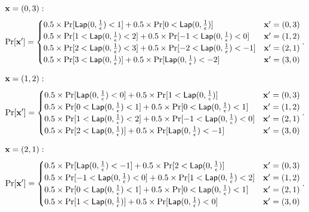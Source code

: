 \documentclass{article}
\begin{document}
{\small

\noindent $\textbf{x} = (0,3):$
\[
\Pr[\dataobs']
= \begin{cases}
	0.5 \times 
 	\Pr[	\lap{0}{\frac{1}{\epsilon}}	<	1] 
 	+ 	
 	0.5 \times 
 	\Pr[	0	< \lap{0}{\frac{1}{\epsilon}}] 
%
	& \dataobs' = (0, 3)\\
%
 	0.5 \times 
 	\Pr[	1	< \lap{0}{\frac{1}{\epsilon}}	<	2] 
 	+ 	
 	0.5 \times 
 	\Pr[	-1	< \lap{0}{\frac{1}{\epsilon}}	<	0] 
%
	& \dataobs' = (1, 2)\\
%
 	0.5 \times 
 	\Pr[	2	<	\lap{0}{\frac{1}{\epsilon}}	<	3] 
 	+ 	
 	0.5 \times 
 	\Pr[	-2	< \lap{0}{\frac{1}{\epsilon}}	<	-1] 
%
	& \dataobs' = (2, 1)\\
%
 	0.5 \times 
 	\Pr[	3	<	\lap{0}{\frac{1}{\epsilon}}]
 	+ 	
 	0.5 \times 
 	\Pr[	\lap{0}{\frac{1}{\epsilon}}	<	-2] 
%
& \dataobs' = (3, 0)
\end{cases}.
\]


\noindent $\textbf{x} = (1,2):$
\[
\Pr[\dataobs']
= \begin{cases}
 	0.5 \times 
 	\Pr[	\lap{0}{\frac{1}{\epsilon}}	<	0] 
 	+ 	
 	0.5 \times 
 	\Pr[	1	< \lap{0}{\frac{1}{\epsilon}}] 
	& \dataobs' = (0, 3)\\
%
 	0.5 \times 
 	\Pr[	0	< \lap{0}{\frac{1}{\epsilon}}	<	1] 
 	+ 	
 	0.5 \times 
 	\Pr[	0	< \lap{0}{\frac{1}{\epsilon}}	<	1] 
	& \dataobs' = (1, 2)\\
%
 	0.5 \times 
 	\Pr[	1	<	\lap{0}{\frac{1}{\epsilon}}	<	2] 
 	+ 	
 	0.5 \times 
 	\Pr[	-1	< \lap{0}{\frac{1}{\epsilon}}	<	0] 
	& \dataobs' = (2, 1)\\
%
 	0.5 \times 
 	\Pr[	2	<	\lap{0}{\frac{1}{\epsilon}}] 
 	+ 	
 	0.5 \times 
 	\Pr[	\lap{0}{\frac{1}{\epsilon}}	<	-1] 
	& \dataobs' = (3, 0)
\end{cases}.
\]

\noindent $\textbf{x} = (2,1):$
\[
\Pr[\dataobs']
= \begin{cases}
 	0.5 \times 
 	\Pr[	\lap{0}{\frac{1}{\epsilon}}	<	-1]
 	+ 	
 	0.5 \times 
 	\Pr[	2	< \lap{0}{\frac{1}{\epsilon}}] 
%
	& \dataobs' = (0, 3)\\
%
 	0.5 \times 
 	\Pr[	-1	< \lap{0}{\frac{1}{\epsilon}}	<	0] 
 	+ 	
 	0.5 \times 
 	\Pr[	1	< \lap{0}{\frac{1}{\epsilon}}	<	2] 
%
	& \dataobs' = (1, 2)\\
%
 	0.5 \times 
 	\Pr[	0	<	\lap{0}{\frac{1}{\epsilon}}	<	1] 
 	+ 	
 	0.5 \times 
 	\Pr[	0	< \lap{0}{\frac{1}{\epsilon}}	<	1] 
%
& \dataobs' = (2, 1)\\
%
 	0.5 \times 
 	\Pr[	1	<	\lap{0}{\frac{1}{\epsilon}}	] 
 	+ 	
 	0.5 \times 
 	\Pr[	\lap{0}{\frac{1}{\epsilon}}	<	0] 
%
& \dataobs' = (3, 0)
\end{cases}.
\]



}
\end{document}
